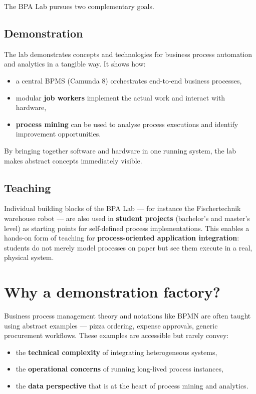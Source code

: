 \documentclass[
  english,
  11pt,
  a4paper,
]{scrbook}
\providecommand{\tightlist}{%
  \setlength{\itemsep}{0pt}\setlength{\parskip}{0pt}}
\begin{document}
The BPA Lab pursues two complementary goals.

\subsection{Demonstration}\label{demonstration}

The lab demonstrates concepts and technologies for business process
automation and analytics in a tangible way. It shows how:

\begin{itemize}
\tightlist
\item
  a central BPMS (Camunda 8) orchestrates end-to-end business processes,
\item
  modular \textbf{job workers} implement the actual work and interact
  with hardware,
\item
  \textbf{process mining} can be used to analyse process executions and
  identify improvement opportunities.
\end{itemize}

By bringing together software and hardware in one running system, the
lab makes abstract concepts immediately visible.

\subsection{Teaching}\label{teaching}

Individual building blocks of the BPA Lab --- for instance the
Fischertechnik warehouse robot --- are also used in \textbf{student
projects} (bachelor's and master's level) as starting points for
self-defined process implementations. This enables a hands-on form of
teaching for \textbf{process-oriented application integration}: students
do not merely model processes on paper but see them execute in a real,
physical system.

\section{Why a demonstration
factory?}\label{why-a-demonstration-factory}

Business process management theory and notations like BPMN are often
taught using abstract examples --- pizza ordering, expense approvals,
generic procurement workflows. These examples are accessible but rarely
convey:

\begin{itemize}
\tightlist
\item
  the \textbf{technical complexity} of integrating heterogeneous
  systems,
\item
  the \textbf{operational concerns} of running long-lived process
  instances,
\item
  the \textbf{data perspective} that is at the heart of process mining
  and analytics.
\end{itemize}
\end{document}
